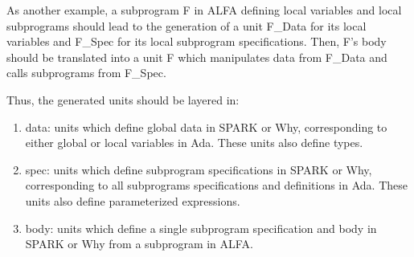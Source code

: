 \documentclass{article}
\begin{document}
As another example, a subprogram F in ALFA defining local variables and local
subprograms should lead to the generation of a unit F\_Data for its local
variables and F\_Spec for its local subprogram specifications. Then, F's body
should be translated into a unit F which manipulates data from F\_Data and
calls subprograms from F\_Spec.

Thus, the generated units should be layered in:
\begin{enumerate}
\item data: units which define global data in SPARK or Why, corresponding to
  either global or local variables in Ada. These units also define types.
\item spec: units which define subprogram specifications in SPARK or Why,
  corresponding to all subprograms specifications and definitions in Ada. These
  units also define parameterized expressions.
\item body: units which define a single subprogram specification and body in
  SPARK or Why from a subprogram in ALFA.
\end{enumerate}
\end{document}
